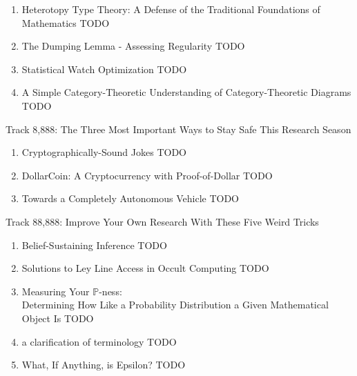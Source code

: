 \documentclass[letter]{article}
\newcommand\track[2]{{\Large Track #1: #2}}
\newcommand\paper[2]{\item \sf #1 \dotfill TODO}
\newcommand\keywords[1]{}
\begin{document}
\begin{enumerate}
\paper{Heterotopy Type Theory: A Defense of the Traditional Foundations of Mathematics}
{Thomas Cramer and Sam Yeager}
\keywords{heterotopy type theory, identity type, freedom of expression axiom}
\paper{The Dumping Lemma - Assessing Regularity}
{Naomi Saphra}
\keywords{computational scatology, formal languages, poop jokes}
\paper{Statistical Watch Optimization}
{Bryce Summers}
\keywords{Watch, clock, time, probability, statistics}
\paper{A Simple Category-Theoretic Understanding of Category-Theoretic Diagrams}
{Stefan Muller}
\keywords{category, diagram, functor, diagram diagram}
\end{enumerate}

\vspace{4em}

\track{8,888}{The Three Most Important Ways to Stay Safe This Research Season}

\begin{enumerate}
\paper{Cryptographically-Sound Jokes}
{Jim McCann}
\keywords{jokes, sha, md5}
\paper{DollarCoin: A Cryptocurrency with Proof-of-Dollar}
{Patrick J. Xia}
\keywords{cryptocurrency,
bitcoin,
dollars,
bills,
gamechanger,
disrupt,
awesome,
supercool,
thebest,
hashtag}
\paper{Towards a Completely Autonomous Vehicle}
{Nicholas Fudala and Chester Francis}
\keywords{pain, suffering, frustration}
\end{enumerate}

\vspace{4em}

\track{88,888}{Improve Your Own Research With These Five Weird Tricks}
\begin{enumerate}
\paper{Belief-Sustaining Inference}
{Alex Reinhart and Jerzy Wieczorek}
\keywords{uninformative likelihood,
statistics,
embarrassment,
cognitive dissonance,
inference}
\paper{Solutions to Ley Line Access in Occult Computing}
{Maija Mednieks}
\keywords{ley lines,
occult computing,
miskatonic university,
installing linux on a dead badger,
playing god}
\paper{Measuring Your $\mathbb{P}$-ness: \\ Determining How Like a Probability Distribution a Given Mathematical Object Is}
{John T. Longwood}
\keywords{lowbrow humour,
probability,
statistics}
\paper{a clarification of terminology}
{David Renshaw}
\keywords{did you mean,
search instead for,
not to be confused with}
\paper{What, If Anything, is Epsilon?}
{Dr. Tom Murphy VII Ph.D.}
\keywords{computational archaeology,
epsilon,
very-small and medium-small numbers}
\end{enumerate}
\end{document}
